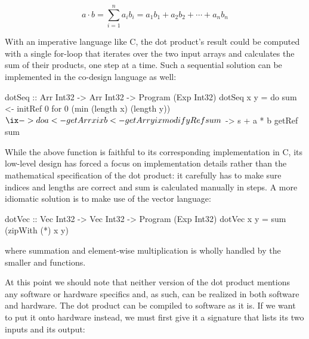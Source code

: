 \documentclass[../paper.tex]{subfiles}
\begin{document}
\begin{equation}
a \cdot b = \sum_{i=1}^{n}a_{i}b_{i} = a_{1}b_{1} + a_{2}b_{2} + \cdots + a_{n}b_{n}
\end{equation}

With an imperative language like C, the dot product's result could be computed with a single for-loop that iterates over the two input arrays and calculates the sum of their products, one step at a time. Such a sequential solution can be implemented in the co-design language as well:

\begin{code}
dotSeq :: Arr Int32 -> Arr Int32 -> Program (Exp Int32)
dotSeq x y = do
  sum <- initRef 0
  for 0 (min (length x) (length y)) $ \ix -> do
    a <- getArr x ix
    b <- getArr y ix
    modifyRef sum $ \s -> s + a * b
  getRef sum
\end{code}

While the above function is faithful to its corresponding implementation in C, its low-level design has forced a focus on implementation details rather than the mathematical specification of the dot product: it carefully has to make sure indices and lengths are correct and sum is calculated manually in steps. A more idiomatic solution is to make use of the vector language:


\begin{code}
dotVec :: Vec Int32 -> Vec Int32 -> Program (Exp Int32)
dotVec x y = sum (zipWith (*) x y)
\end{code}

\noindent where summation and element-wise multiplication is wholly handled by the smaller  and  functions.

At this point we should note that neither version of the dot product mentions any software or hardware specifics and, as such, can be realized in both software and hardware. The dot product can be compiled to software as it is. If we want to put it onto hardware instead, we must first give it a signature that lists its two inputs and its output:

\end{document}
